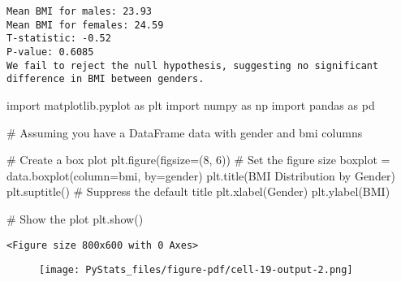 \documentclass[
  letterpaper,
  DIV=11,
  numbers=noendperiod]{scrartcl}
\newenvironment{Shaded}{\begin{snugshade}}{\end{snugshade}}
\newcommand{\CommentTok}[1]{\textcolor[rgb]{0.37,0.37,0.37}{#1}}
\newcommand{\DecValTok}[1]{\textcolor[rgb]{0.68,0.00,0.00}{#1}}
\newcommand{\ImportTok}[1]{\textcolor[rgb]{0.00,0.46,0.62}{#1}}
\newcommand{\NormalTok}[1]{\textcolor[rgb]{0.00,0.23,0.31}{#1}}
\newcommand{\OperatorTok}[1]{\textcolor[rgb]{0.37,0.37,0.37}{#1}}
\newcommand{\StringTok}[1]{\textcolor[rgb]{0.13,0.47,0.30}{#1}}
\begin{document}
\begin{verbatim}
Mean BMI for males: 23.93
Mean BMI for females: 24.59
T-statistic: -0.52
P-value: 0.6085
We fail to reject the null hypothesis, suggesting no significant difference in BMI between genders.
\end{verbatim}

\begin{Shaded}
\begin{Highlighting}[]
\ImportTok{import}\NormalTok{ matplotlib.pyplot }\ImportTok{as}\NormalTok{ plt}
\ImportTok{import}\NormalTok{ numpy }\ImportTok{as}\NormalTok{ np}
\ImportTok{import}\NormalTok{ pandas }\ImportTok{as}\NormalTok{ pd}

\CommentTok{\# Assuming you have a DataFrame \textquotesingle{}data\textquotesingle{} with \textquotesingle{}gender\textquotesingle{} and \textquotesingle{}bmi\textquotesingle{} columns}

\CommentTok{\# Create a box plot}
\NormalTok{plt.figure(figsize}\OperatorTok{=}\NormalTok{(}\DecValTok{8}\NormalTok{, }\DecValTok{6}\NormalTok{))  }\CommentTok{\# Set the figure size}
\NormalTok{boxplot }\OperatorTok{=}\NormalTok{ data.boxplot(column}\OperatorTok{=}\StringTok{\textquotesingle{}bmi\textquotesingle{}}\NormalTok{, by}\OperatorTok{=}\StringTok{\textquotesingle{}gender\textquotesingle{}}\NormalTok{)}
\NormalTok{plt.title(}\StringTok{\textquotesingle{}BMI Distribution by Gender\textquotesingle{}}\NormalTok{)}
\NormalTok{plt.suptitle(}\StringTok{\textquotesingle{}\textquotesingle{}}\NormalTok{)  }\CommentTok{\# Suppress the default title}
\NormalTok{plt.xlabel(}\StringTok{\textquotesingle{}Gender\textquotesingle{}}\NormalTok{)}
\NormalTok{plt.ylabel(}\StringTok{\textquotesingle{}BMI\textquotesingle{}}\NormalTok{)}

\CommentTok{\# Show the plot}
\NormalTok{plt.show()}
\end{Highlighting}
\end{Shaded}

\begin{verbatim}
<Figure size 800x600 with 0 Axes>
\end{verbatim}

\begin{figure}[H]

{\centering \texttt{[image: PyStats\_files/figure-pdf/cell-19-output-2.png]}

}

\end{figure}
\end{document}
